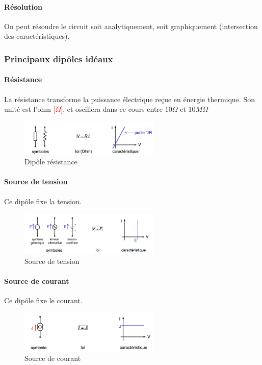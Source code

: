 \documentclass[a4paper]{article}
\begin{document}
    \paragraph{Résolution} On peut résoudre le circuit soit analytiquement, soit
    graphiquement (intersection des caractéristiques).

    \subsubsection{Principaux dipôles idéaux}
    \paragraph{Résistance} La résistance transforme la puissance électrique reçue
    en énergie thermique. Son unité est l'ohm \textcolor{red}{[$\Omega$]}, et
    oscillera dans ce cours entre $10\Omega$ et $10M\Omega$
    \begin{figure}[H]
        \begin{center}
            \includegraphics[width=0.6\textwidth]{fig/2_resistance.png}
            \caption{Dipôle résistance}
        \end{center}
    \end{figure}

    \paragraph{Source de tension} Ce dipôle fixe la tension.
    \begin{figure}[H]
        \begin{center}
            \includegraphics[width=0.6\textwidth]{fig/2_sourcetension.png}
            \caption{Source de tension}
        \end{center}
    \end{figure}

    \paragraph{Source de courant} Ce dipôle fixe le courant.
    \begin{figure}[H]
        \begin{center}
            \includegraphics[width=0.6\textwidth]{fig/2_sourcecourant.png}
            \caption{Source de courant}
        \end{center}
    \end{figure}
\end{document}
